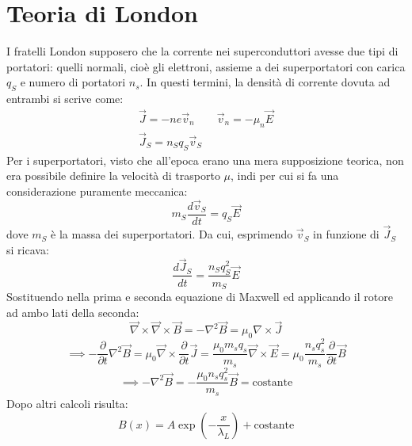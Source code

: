 \documentclass{book}
\begin{document}
    \section{Teoria di London}
        I fratelli London supposero che la corrente nei superconduttori avesse due tipi di portatori: quelli normali, cioè gli elettroni, assieme a dei superportatori con carica $q_{S}$ e numero di portatori $n_{s}$. In questi termini, la densità di corrente dovuta ad entrambi si scrive come:
        \begin{align}
            \vec{J} = -ne\vec{v}_{n} \qquad \vec{v}_{n}=-\mu_{n}\vec{E} \\
            \vec{J}_{S} = n_{S}q_{S}\vec{v}_{S} 
        \end{align}
        Per i superportatori, visto che all'epoca erano una mera supposizione teorica, non era possibile definire la velocità di trasporto $\mu$, indi per cui si fa una considerazione puramente meccanica:
        \begin{equation}
            m_{S}\frac{d\vec{v}_{S}}{dt} = q_{S}\vec{E}
        \end{equation}
        dove $m_{S}$ è la massa dei superportatori.
        Da cui, esprimendo $\vec{v}_{S}$ in funzione di $\vec{J}_{S}$ si ricava:
        \begin{equation}
            \frac{d\vec{J}_{S}}{dt} =\frac{n_{S}q_{S} ^{2}}{m_{S}}\vec{E}
        \end{equation}
        Sostituendo nella prima e seconda equazione di Maxwell ed applicando il rotore ad ambo lati della seconda:
        \begin{equation}
            \vec{\nabla} \times \vec{\nabla} \times \vec{B} = - \nabla^{2}\vec{B} = \mu_{0} \nabla \times \vec{J}
        \end{equation}
        \begin{equation}
            \implies -\frac{\partial}{\partial t}\nabla^{2}\vec{B} = \mu_{0} \vec{\nabla} \times \frac{\partial}{\partial t} \vec{J} = \frac{\mu_{0}m_{s}q_{s}}{m_{s}}\vec{\nabla} \times \vec{E} = \mu_{0} \frac{n_{s}q_{s} ^{2}}{m_{s}}\frac{\partial}{ \partial t} \vec{B}
        \end{equation}
        \begin{equation}
            \implies  - \nabla ^{2} \vec{B} = -\frac{\mu_{0}n_{s}q_{s} ^{2}}{m_{s}}\vec{B} = \textrm{costante}
        \end{equation}
        Dopo altri calcoli risulta:
        \begin{equation}
            B(x) = A\exp{(-\frac{x}{\lambda_{L}})}+\textrm{costante}
        \end{equation}
\end{document}
